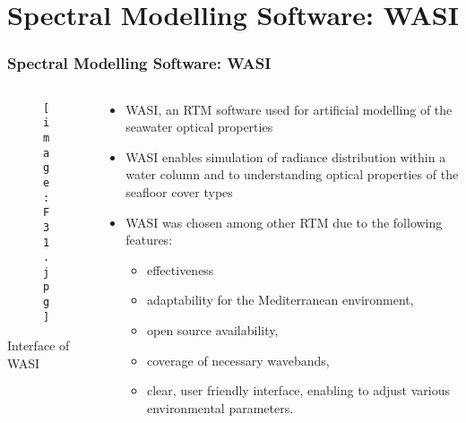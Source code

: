 \documentclass[pdflatex,compress,9pt,
	xcolor={dvipsnames,dvipsnames,svgnames,x11names,table},
	hyperref={colorlinks = true,breaklinks = true, urlcolor = NavyBlue, breaklinks = true}]{beamer}
\begin{document}
\section{Spectral Modelling Software: WASI}
\begin{frame}\frametitle{Spectral Modelling Software: WASI}
\begin{minipage}[0.4\textheight]{\textwidth}
\begin{columns}[T]
\begin{column}{0.4\textwidth}
\vspace{1em}
\begin{figure}[H]
	\centering
		\texttt{[image: F31.jpg]}
\end{figure}
Interface of WASI
\end{column}
\begin{column}{0.6\textwidth}
\begin{itemize}
	\item \ac{WASI}, an \ac{RTM} software used for artificial modelling of the seawater optical properties
	\item \ac{WASI} enables simulation of radiance distribution within a water column and to understanding optical properties of the seafloor cover types
	\item \ac{WASI} was chosen among other \ac{RTM} due to the following features:
	\begin{itemize}
		\item effectiveness
		\item adaptability for the Mediterranean environment,
		\item open source availability,
		\item coverage of necessary wavebands,
		\item clear, user friendly interface, enabling to adjust various environmental parameters.
	\end{itemize}
\end{itemize}
\end{column}
\end{columns}
\end{minipage}
\end{frame}
\end{document}
